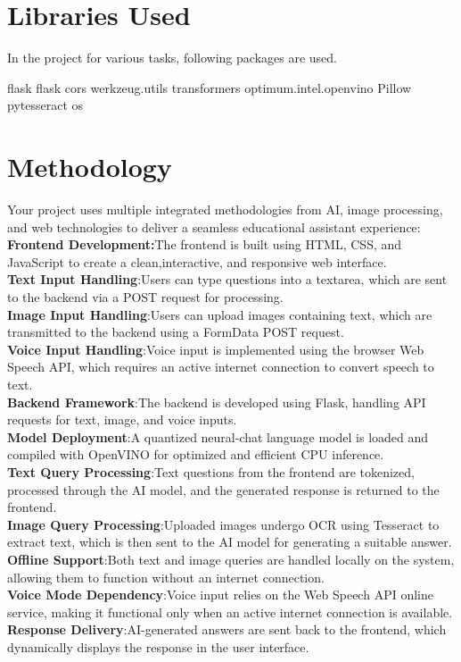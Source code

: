 \documentclass{josis}
\begin{document}
\section{Libraries Used}
In the project for various tasks, following packages are used.
\begin{python}
flask
flask cors
werkzeug.utils 
transformers 
optimum.intel.openvino  
Pillow
pytesseract 
os 
\end{python}
\section{Methodology}
Your project uses multiple integrated methodologies from AI, image processing, and web technologies to deliver a seamless educational assistant experience:\\
\textbf{ Frontend Development:}The frontend is built using HTML, CSS, and JavaScript to create a clean,interactive, and responsive web interface.\\
\textbf{Text Input Handling}:Users can type questions into a textarea, which are sent to the backend via a POST request for processing.\\
\textbf{Image Input Handling}:Users can upload images containing text, which are transmitted to the backend using a FormData POST request.\\
\textbf{Voice Input Handling}:Voice input is implemented using the browser Web Speech API, which requires an active internet connection to convert speech to text.\\
\textbf{Backend Framework}:The backend is developed using Flask, handling API requests for text, image, and voice inputs.\\
\textbf{Model Deployment}:A quantized neural-chat language model is loaded and compiled with OpenVINO for optimized and efficient CPU inference.\\
\textbf{Text Query Processing}:Text questions from the frontend are tokenized, processed through the AI model, and the generated response is returned to the frontend.\\
\textbf{Image Query Processing}:Uploaded images undergo OCR using Tesseract to extract text, which is then sent to the AI model for generating a suitable answer.\\
\textbf{Offline Support}:Both text and image queries are handled locally on the system, allowing them to function without an internet connection.\\
\textbf{Voice Mode Dependency}:Voice input relies on the Web Speech API online service, making it functional only when an active internet connection is available.\\
\textbf{Response Delivery}:AI-generated answers are sent back to the frontend, which dynamically displays the response in the user interface.\\
\end{document}
